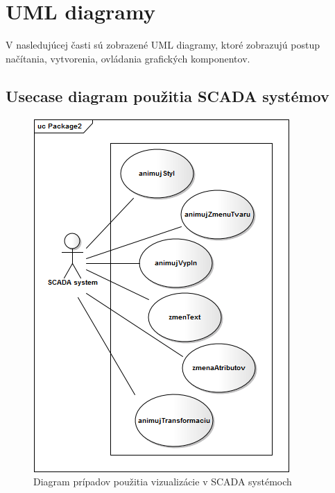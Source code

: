 \section{UML diagramy}
V nasledujúcej časti sú zobrazené UML diagramy, ktoré zobrazujú postup načítania, vytvorenia, ovládania grafických komponentov.
	\subsection{Usecase diagram použitia SCADA systémov}
	\begin{figure}[H]
		\centering
		\includegraphics[width=0.5\linewidth]{uml/usecase.png}
		\caption{Diagram prípadov použitia vizualizácie v SCADA systémoch}
		\label{fig:USECASE}
	\end{figure}


